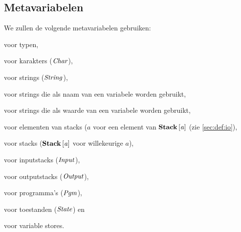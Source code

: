 \subsection{Metavariabelen}
\label{sec:def:meta}
We zullen de volgende metavariabelen gebruiken:

\begin{description}[labelindent=\parindent]
	\item[$a$] voor typen,
	\item[$c$] voor karakters ($\mathit{Char}$),
	\item[$s$] voor strings ($\mathit{String}$),
	\item[$\var$] voor strings die als naam van een variabele worden gebruikt,
	\item[$\val$] voor strings die als waarde van een variabele worden gebruikt,
	\item[$e$] voor elementen van stacks ($a$ voor een element van $\mathbf{Stack}\left[\mathit{a}\right]$
		(zie \autoref{sec:def:io}),
	\item[$\stk$] voor stacks ($\mathbf{Stack}\left[\mathit{a}\right]$ voor willekeurige $a$),
	\item[$\ip$] voor inputstacks ($\mathit{Input}$),
	\item[$\op$] voor outputstacks ($\mathit{Output}$),
	\item[$\pgm$] voor programma's ($\mathit{Pgm}$),
	\item[$\st$] voor toestanden ($\mathit{State}$) en
	\item[$\str$] voor variable stores.
\end{description}
